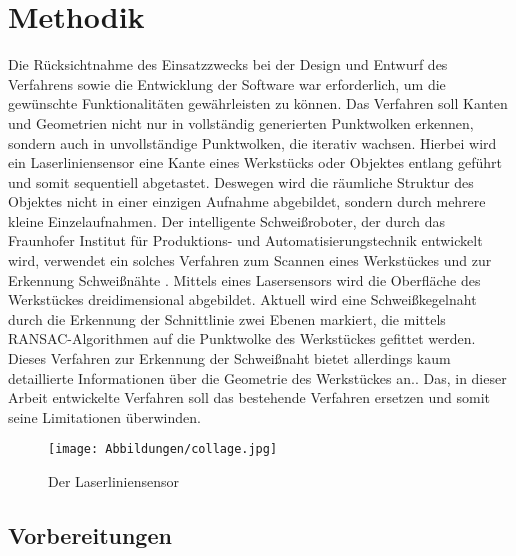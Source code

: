 

\chapter{Methodik} \label{Methodik}
Die Rücksichtnahme des Einsatzzwecks bei der Design und Entwurf des Verfahrens sowie die Entwicklung der Software war erforderlich, um die gewünschte Funktionalitäten gewährleisten zu können. Das Verfahren soll Kanten und Geometrien nicht nur in vollständig generierten Punktwolken erkennen, sondern auch in unvollständige Punktwolken, die iterativ wachsen. Hierbei wird ein Laserliniensensor eine Kante eines Werkstücks oder Objektes entlang geführt und somit sequentiell abgetastet. Deswegen wird die räumliche Struktur des Objektes nicht in einer einzigen Aufnahme abgebildet, sondern durch mehrere kleine Einzelaufnahmen. Der intelligente Schweißroboter, der durch das Fraunhofer Institut für Produktions- und Automatisierungstechnik entwickelt wird, verwendet ein solches Verfahren zum Scannen eines Werkstückes und zur Erkennung Schweißnähte \autocite[39]{savla_intelligente_2022}. Mittels eines Lasersensors wird die Oberfläche des Werkstückes dreidimensional abgebildet. Aktuell wird eine Schweißkegelnaht durch die Erkennung der Schnittlinie zwei Ebenen markiert, die mittels RANSAC-Algorithmen auf die Punktwolke des Werkstückes gefittet werden. Dieses Verfahren zur Erkennung der Schweißnaht bietet allerdings kaum detaillierte Informationen über die Geometrie des Werkstückes an.\autocite[39-52]{savla_intelligente_2022}. Das, in dieser Arbeit entwickelte Verfahren soll das bestehende Verfahren ersetzen und somit seine Limitationen überwinden. %

\begin{figure}[h]
	\texttt{[image: Abbildungen/collage.jpg]}
	\centering
	\caption{Der Laserliniensensor} 
\end{figure}

\section{Vorbereitungen} \label{agpn_reproduction}
